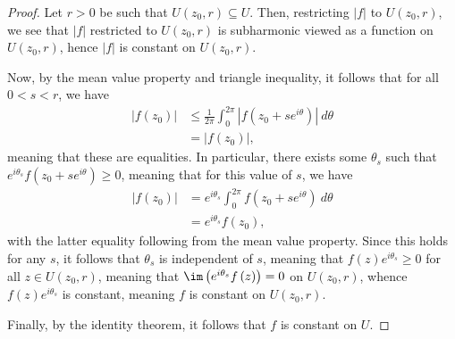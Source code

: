 \documentclass[10pt]{mypackage}
\begin{document}
\begin{proof}
  Let $r > 0$ be such that $U\left( z_0,r \right)\subseteq U$. Then, restricting $\left\vert f \right\vert$ to $U\left( z_0,r \right)$, we see that $\left\vert f \right\vert$ restricted to $U\left( z_0,r \right)$ is subharmonic viewed as a function on $U\left( z_0,r \right)$, hence $\left\vert f \right\vert$ is constant on $U\left( z_0,r \right)$.\newline

  Now, by the mean value property and triangle inequality, it follows that for all $0 < s < r$, we have
  \begin{align*}
    \left\vert f\left( z_0 \right) \right\vert &\leq \frac{1}{2\pi} \int_{0}^{2\pi} \left\vert f\left( z_0 + se^{i\theta} \right) \right\vert\:d\theta\\
                                               &= \left\vert f\left( z_0 \right) \right\vert,
  \end{align*}
  meaning that these are equalities. In particular, there exists some $\theta_s$ such that $e^{i\theta_s} f\left( z_0 + se^{i\theta} \right) \geq 0$, meaning that for this value of $s$, we have
  \begin{align*}
    \left\vert f\left( z_0 \right) \right\vert &= e^{i\theta_s} \int_{0}^{2\pi} f\left( z_0 + se^{i\theta} \right)\:d\theta\\
                                               &= e^{i\theta_s} f\left( z_0 \right),
  \end{align*}
  with the latter equality following from the mean value property. Since this holds for any $s$, it follows that $\theta_s$ is independent of $s$, meaning that $f(z)e^{i\theta_s} \geq 0$ for all $z\in U\left( z_0,r \right)$, meaning that $\im\left( e^{i\theta_s}f\left( z \right) \right) = 0$ on $U\left( z_0,r \right)$, whence $f(z)e^{i\theta_s}$ is constant, meaning $f$ is constant on $U\left( z_0,r \right)$.\newline

  Finally, by the identity theorem, it follows that $f$ is constant on $U$.
\end{proof}
\end{document}
